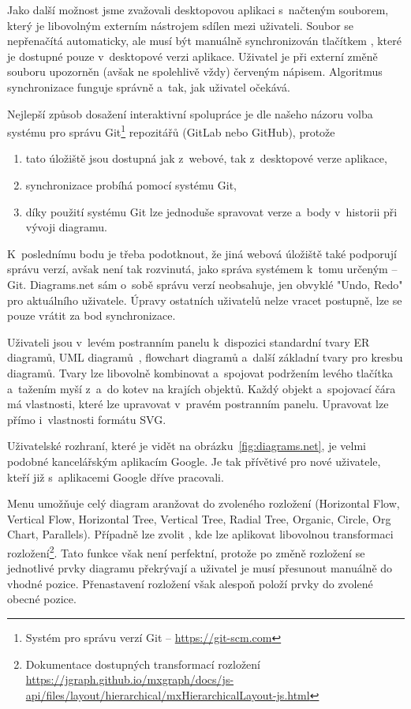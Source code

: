 Jako další možnost jsme zvažovali desktopovou aplikaci s~načteným souborem, který je libovolným externím nástrojem sdílen mezi uživateli.
Soubor se nepřenačítá automaticky, ale musí být manuálně synchronizován tlačítkem , které je dostupné pouze v~desktopové verzi aplikace.
Uživatel je při externí změně souboru upozorněn (avšak ne spolehlivě vždy) červeným nápisem.
Algoritmus synchronizace funguje správně a~tak, jak uživatel očekává.

Nejlepší způsob dosažení interaktivní spolupráce je dle našeho názoru volba systému pro správu Git\footnote{Systém pro správu verzí Git -- \url{https://git-scm.com}} repozitářů (GitLab nebo GitHub), protože
\begin{enumerate}
  \item tato úložiště jsou dostupná jak z~webové, tak z~desktopové verze aplikace,
  \item synchronizace probíhá pomocí systému Git,
  \item díky použití systému Git lze jednoduše spravovat verze a~body v~historii při vývoji diagramu.
\end{enumerate}

K~poslednímu bodu je třeba podotknout, že jiná webová úložiště také podporují správu verzí, avšak není tak rozvinutá, jako správa systémem k~tomu určeným -- Git.
Diagrams.net sám o~sobě správu verzí neobsahuje, jen obvyklé "Undo, Redo" pro aktuálního uživatele.
Úpravy ostatních uživatelů nelze vracet postupně, lze se pouze vrátit za bod synchronizace.

Uživateli jsou v~levém postranním panelu k~dispozici standardní tvary ER diagramů, UML diagramů~\cite{uml2017}, flowchart diagramů a~další základní tvary pro kresbu diagramů.
Tvary lze libovolně kombinovat a~spojovat podržením levého tlačítka a~tažením myší z~a~do kotev na krajích objektů.
Každý objekt a~spojovací čára má vlastnosti, které lze upravovat v~pravém postranním panelu.
Upravovat lze přímo i~vlastnosti formátu SVG.

Uživatelské rozhraní, které je vidět na obrázku~\ref{fig:diagrams.net}, je velmi podobné kancelářským aplikacím Google.
Je tak přívětivé pro nové uživatele, kteří již s~aplikacemi Google dříve pracovali.

Menu  umožňuje celý diagram aranžovat do zvoleného rozložení (Horizontal Flow, Vertical Flow, Horizontal Tree, Vertical Tree, Radial Tree, Organic, Circle, Org Chart, Parallels).
Případně lze zvolit , kde lze aplikovat libovolnou transformaci rozložení\footnote{Dokumentace dostupných transformací rozložení \url{https://jgraph.github.io/mxgraph/docs/js-api/files/layout/hierarchical/mxHierarchicalLayout-js.html}}.
Tato funkce však není perfektní, protože po změně rozložení se jednotlivé prvky diagramu překrývají a uživatel je musí přesunout manuálně do vhodné pozice.
Přenastavení rozložení však alespoň položí prvky do zvolené obecné pozice.

